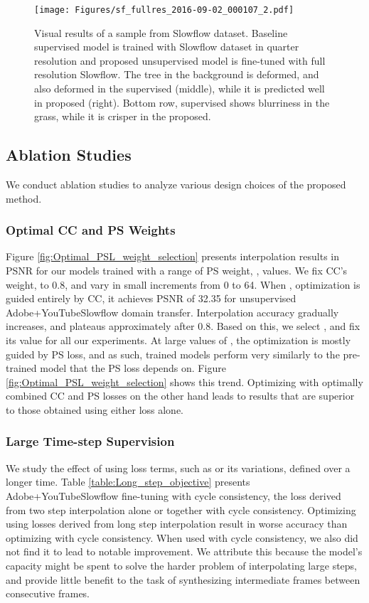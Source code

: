 \documentclass[10pt,twocolumn,letterpaper]{article}
\renewcommand{\textrightarrow}{}
\begin{document}
\begin{figure}[t]
    \centering
    \texttt{[image: Figures/sf\_fullres\_2016-09-02\_000107\_2.pdf]}
    \caption{Visual results of a sample from Slowflow dataset. Baseline supervised model is trained with Slowflow dataset in quarter resolution and proposed unsupervised model is fine-tuned with full resolution Slowflow. The tree in the background is deformed, and also deformed in the supervised (middle), while it is predicted well in proposed (right). Bottom row, supervised shows blurriness in the grass, while it is crisper in the proposed.}
    \label{fig:Sf_spatial_transfer}
\end{figure}



\subsection{Ablation Studies}

We conduct ablation studies to analyze various design choices of the proposed method. 
\subsubsection{Optimal CC and PS Weights}\label{optimal_PSL_weight}
Figure \ref{fig:Optimal_PSL_weight_selection} presents interpolation results in PSNR for our models trained with a range of PS weight, , values. We fix CC's weight,  to 0.8, and vary  in small increments from 0 to 64. When , optimization is guided entirely by CC, it achieves PSNR of 32.35 for unsupervised Adobe+YouTube\textrightarrow Slowflow domain transfer. Interpolation accuracy gradually increases, and plateaus approximately after 0.8. Based on this, we select , and fix its value for all our experiments. At large values of , the optimization is mostly guided by PS loss, and as such, trained models perform very similarly to the pre-trained model that the PS loss depends on. Figure \ref{fig:Optimal_PSL_weight_selection} shows this trend. Optimizing with optimally combined CC and PS losses on the other hand leads to results that are superior to those obtained using either loss alone. 

 
\subsubsection{Large Time-step Supervision}
\label{large_step_supervision}
We study the effect of using loss terms, such as  or its variations, defined over a longer time. Table \ref{table:Long_step_objective} presents Adobe+YouTube\textrightarrow Slowflow fine-tuning with cycle consistency, the loss derived from two step interpolation alone or together with cycle consistency. Optimizing using losses derived from long step interpolation result in worse accuracy than optimizing with cycle consistency. When used with cycle consistency, we also did not find it to lead to notable improvement. We attribute this because the model's capacity might be spent to solve the harder problem of interpolating large steps, and provide little benefit to the task of synthesizing intermediate frames between consecutive frames.
\end{document}

